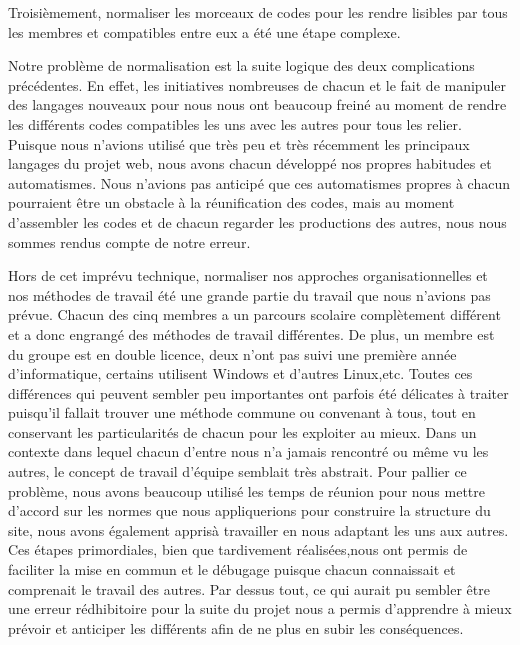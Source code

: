 \documentclass[12pt]{report}
\begin{document}
        \bigskip
        \par
        Troisièmement, normaliser les morceaux de codes pour les rendre lisibles par tous les membres et compatibles entre eux a été une étape complexe.
        \par
        Notre problème de normalisation est la suite logique des deux complications précédentes. En effet, les initiatives nombreuses de chacun et le fait de manipuler des langages nouveaux pour nous nous ont beaucoup freiné au moment de rendre les différents codes compatibles les uns avec les autres pour tous les relier. Puisque nous n’avions utilisé que très peu et très récemment les principaux langages du projet web, nous avons chacun développé nos propres habitudes et automatismes. Nous n’avions pas anticipé que ces automatismes propres à chacun pourraient être un obstacle à la réunification des codes, mais au moment d’assembler les codes et de chacun regarder les productions des autres, nous nous sommes rendus compte de notre erreur.
        \par
        Hors de cet imprévu technique, normaliser nos approches organisationnelles et nos méthodes de travail été une grande partie du travail que nous n’avions pas prévue. Chacun des cinq membres a un parcours scolaire complètement différent et a donc engrangé des méthodes de travail différentes. De plus, un membre est du groupe est en double licence, deux n’ont pas suivi une première année d’informatique, certains utilisent Windows et d’autres Linux,etc. Toutes ces différences qui peuvent sembler peu importantes ont parfois été délicates à traiter puisqu’il fallait trouver une méthode commune ou convenant à tous, tout en conservant les particularités de chacun pour les exploiter au mieux. Dans un contexte dans lequel chacun d’entre nous n’a jamais rencontré ou même vu les autres, le concept de travail d’équipe semblait très abstrait. Pour pallier ce problème, nous avons beaucoup utilisé les temps de réunion pour nous mettre d’accord sur les normes que nous appliquerions pour construire la structure du site, nous avons également apprisà travailler en nous adaptant les uns aux autres. Ces étapes primordiales, bien que tardivement réalisées,nous ont permis de faciliter la mise en commun et le débugage puisque chacun connaissait et comprenait le travail des autres. Par dessus tout, ce qui aurait pu sembler être une erreur rédhibitoire pour la suite du projet nous a permis d’apprendre à mieux prévoir et anticiper les différents afin de ne plus en subir les conséquences.
        
\end{document}
